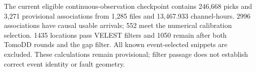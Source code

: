 The current eligible continuous-observation checkpoint contains 246,668 picks and 3,271 provisional associations from 1,285 files and 13,467.933 channel-hours. 2996 associations have causal usable arrivals; 552 meet the numerical calibration selection. 1435 locations pass VELEST filters and 1050 remain after both TomoDD rounds and the gap filter. All known event-selected snippets are excluded. These calculations remain provisional; filter passage does not establish correct event identity or fault geometry.
